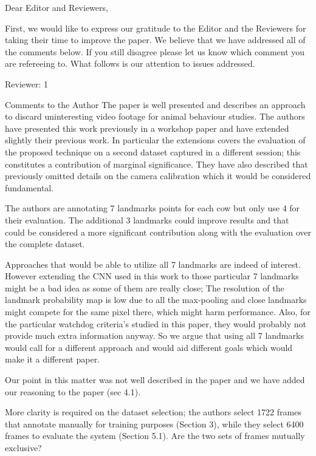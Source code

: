 \documentclass[10pt,a4paper]{letter}
\begin{document}
 
\begin{letter}{} 
\opening{Dear Editor and Reviewers,} 
 
First, we would like to express our gratitude to the Editor and the Reviewers for taking their time to
improve the paper. We believe that we have addressed all of the comments below. If you still disagree please let us know which comment you are refereeing to. What follows is our attention to issues addressed.


\begin{siderules}
Reviewer: 1

Comments to the Author
The paper is well presented and describes an approach to discard uninteresting video footage for animal behaviour studies. 
The authors have presented this work previously in a workshop paper and have extended slightly their previous work. 
In particular the extensions covers the evaluation of the proposed technique on a second dataset captured in a different session; 
this constitutes a contribution of marginal significance. 
They have also described that previously omitted details on the camera calibration which it would be considered fundamental.

The authors are annotating 7 landmarks points for each cow but only use 4 for their evaluation. The additional 3 landmarks could improve 
results and that could be considered a more significant contribution along with the evaluation over the complete dataset.
\end{siderules}

Approaches that would be able to utilize all 7 landmarks are indeed of interest. However extending the CNN
used in this work to those particular 7 landmarks might be a bad idea as some of them are really close; The resolution of the landmark probability map is low due
to all the max-pooling and close landmarks might compete for the same pixel there, which might harm performance. 
Also, for the particular watchdog criteria's 
studied in this paper, they would probably not provide much extra information anyway. So we argue that using all 7 landmarks 
would call for a different approach and would aid different goals which would make it a different paper.

Our point in this matter was not well described in the paper and we have added our reasoning to the paper (sec 4.1).

\begin{siderules}
More clarity is required on the dataset selection; the authors select 1722 frames that annotate manually for training purposes (Section 3), 
while they select 6400 frames to evaluate the system (Section 5.1). Are the two sets of frames mutually exclusive?
\end{siderules}


\end{letter}
\end{document}
